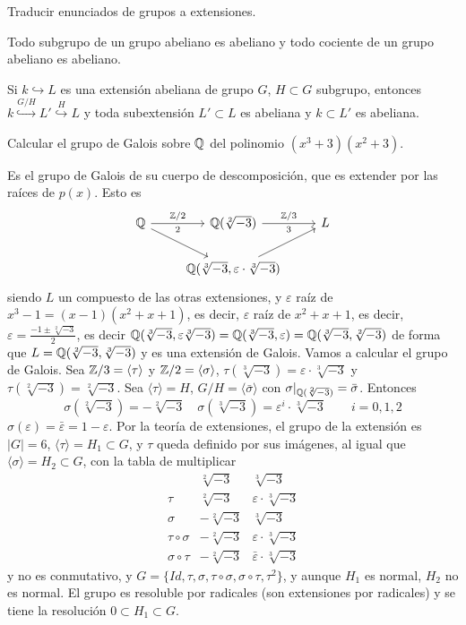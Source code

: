 \begin{ejer}
    Traducir enunciados de grupos a extensiones. 

    Todo subgrupo de un grupo abeliano es abeliano y todo cociente de un grupo abeliano es abeliano.

    Si $k \hookrightarrow L$ es una extensi\'on abeliana de grupo $G$, $H\subset G$ subgrupo, entonces $k \overset{G/H}{\hookrightarrow} L' \overset{H}{\hookrightarrow} L$ y toda subextensi\'on $L' \subset L$ es abeliana y $k \subset L'$ es abeliana. 
\end{ejer}
\begin{ejer}
    Calcular el grupo de Galois sobre $\mathbb{Q}$ del polinomio $(x^3+3)(x^2+3)$. 
\end{ejer}
\begin{dem}
    Es el grupo de Galois de su cuerpo de descomposici\'on, que es extender por las ra\'ices de $p(x)$. Esto es
    $$\bt \bb Q \rar{\bb Z/2}[swap]{2} \arrow{dr} & \bb Q(\sqrt[2]{-3}) \rar{\bb Z/3}[swap]{3} & L\\ & \bb Q(\sqrt[3]{-3}, \varepsilon \cdot \sqrt[3]{-3}) \arrow{ru} &  \et$$
    siendo $L$ un compuesto de las otras extensiones, y $\varepsilon$ ra\'iz de $x^3-1 = (x-1)(x^2+x+1)$, es decir, $\varepsilon$ ra\'iz de $x^2+x+1$, es decir, $\varepsilon = \frac{-1\pm \sqrt[2]{-3}}{2}$, es decir $\mathbb{Q}(\sqrt[3]{-3}, \varepsilon\sqrt[3]{-3}) = \mathbb{Q}(\sqrt[3]{-3}, \varepsilon) = \mathbb{Q}(\sqrt[3]{-3}, \sqrt[2]{-3})$ de forma que $L = \mathbb{Q}(\sqrt[2]{-3}, \sqrt[3]{-3})$ y es una extensi\'on de Galois. Vamos a calcular el grupo de Galois. Sea $\mathbb{Z}/3 = \langle\tau\rangle$ y $\mathbb{Z}/2 = \langle \sigma \rangle$, $\tau(\sqrt[3]{-3}) = \varepsilon\cdot \sqrt[3]{-3}$ y $\tau(\sqrt[2]{-3})=\sqrt[2]{-3}$. Sea $\langle \tau \rangle =H$, $G/H = \langle \bar \sigma \rangle$ con $\sigma|_{\mathbb{Q}(\sqrt[2]{-3})} = \bar \sigma$. Entonces
    $$\sigma(\sqrt[2]{-3}) = -\sqrt[2]{-3} \quad \sigma(\sqrt[3]{-3}) = \varepsilon^i \cdot \sqrt[3]{-3}\qquad i = 0,1,2$$
    $\sigma (\varepsilon) = \bar \varepsilon = 1-\varepsilon$. Por la teor\'ia de extensiones, el grupo de la extensi\'on es $|G|=6$, $\langle \tau \rangle = H_1 \subset G$, y $\tau$ queda definido por sus im\'agenes, al igual que $\langle \sigma \rangle = H_2 \subset G$, con la tabla de multiplicar
    $$\begin{array}{c|c|c}
        & \sqrt[2]{-3} & \sqrt[3]{-3}   \\ \hline 
        \tau & \sqrt[2]{-3} & \varepsilon\cdot \sqrt[3]{-3}  \\\hline 
        \sigma & -\sqrt[2]{-3}  & \sqrt[3]{-3}  \\\hline 
        \tau \circ \sigma & -\sqrt[2]{-3} & \varepsilon \cdot \sqrt[3]{-3} \\\hline
        \sigma \circ \tau & - \sqrt[2]{-3}  & \bar \varepsilon \cdot \sqrt[3]{-3} 
    \end{array}$$
    y no es conmutativo, y $G =\{Id, \tau, \sigma, \tau\circ \sigma, \sigma \circ \tau, \tau^2\}$, y aunque $H_1$ es normal, $H_2$ no es normal. El grupo es resoluble por radicales (son extensiones por radicales) y se tiene la resoluci\'on $0\subset H_1 \subset G$. 
\end{dem}
